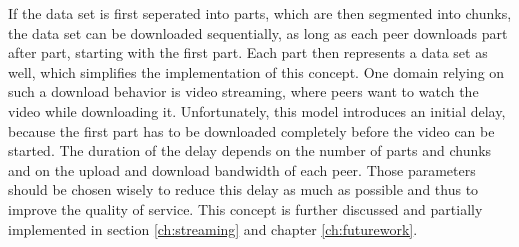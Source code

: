 If the data set is first seperated into parts, which are then segmented into chunks, the data set can be downloaded sequentially, as long as each peer downloads part after part, starting with the first part. Each part then represents a data set as well, which simplifies the implementation of this concept. One domain relying on such a download behavior is video streaming, where peers want to watch the video while downloading it. Unfortunately, this model introduces an initial delay, because the first part has to be downloaded completely before the video can be started. The duration of the delay depends on the number of parts and chunks and on the upload and download bandwidth of each peer. Those parameters should be chosen wisely to reduce this delay as much as possible and thus to improve the quality of service. This concept is further discussed and partially implemented in section \ref{ch:streaming} and chapter \ref{ch:futurework}.

